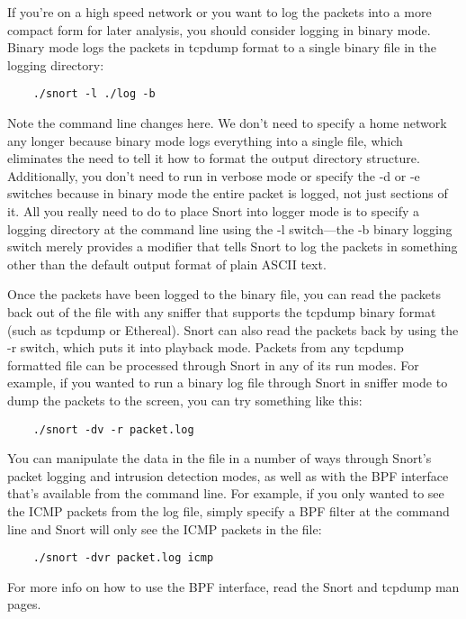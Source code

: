 \documentclass[english]{report}
\begin{document}
If you're on a high speed network or you want to log the packets into a more
compact form for later analysis, you should consider logging in binary mode.
Binary mode logs the packets in tcpdump format to a single binary file in the
logging directory:

\begin{verbatim}
    ./snort -l ./log -b
\end{verbatim}

Note the command line changes here. We don't need to specify a home network any
longer because binary mode logs everything into a single file, which eliminates
the need to tell it how to format the output directory structure. Additionally,
you don't need to run in verbose mode or specify the -d or -e switches because
in binary mode the entire packet is logged, not just sections of it. All you
really need to do to place Snort into logger mode is to specify a logging
directory at the command line using the -l switch---the -b binary logging
switch merely provides a modifier that tells Snort to log the packets in
something other than the default output format of plain ASCII text.

Once the packets have been logged to the binary file, you can read the packets
back out of the file with any sniffer that supports the tcpdump binary format
(such as tcpdump or Ethereal). Snort can also read the packets back by using
the -r switch, which puts it into playback mode. Packets from any tcpdump
formatted file can be processed through Snort in any of its run modes. For
example, if you wanted to run a binary log file through Snort in sniffer mode
to dump the packets to the screen, you can try something like this:

\begin{verbatim}
    ./snort -dv -r packet.log
\end{verbatim}

You can manipulate the data in the file in a number of ways through Snort's
packet logging and intrusion detection modes, as well as with the BPF interface
that's available from the command line. For example, if you only wanted to see
the ICMP packets from the log file, simply specify a BPF filter at the command
line and Snort will only see the ICMP packets in the file:

\begin{verbatim}
    ./snort -dvr packet.log icmp 
\end{verbatim}

For more info on how to use the BPF interface, read the Snort and tcpdump man
pages.
\end{document}
